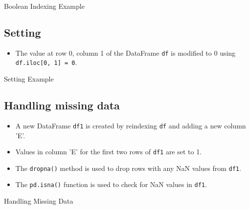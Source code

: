 		\begin{code}[h!]
		    
		
		\caption{Boolean Indexing Example}
		
		\end{code}

		\subsection{Setting}
		\begin{itemize}
			\item The value at row 0, column 1 of the DataFrame \texttt{df} is modified to 0 using \texttt{df.iloc[0, 1] = 0}.
		\end{itemize}
		
			\begin{code}[h!]
			    
			
			\caption{Setting Example}
			
			\end{code}


	\subsection{Handling missing data}
	\begin{itemize}
		
		\item A new DataFrame \texttt{df1} is created by reindexing \texttt{df} and adding a new column 'E'.
		
		\item Values in column 'E' for the first two rows of \texttt{df1} are set to 1.
		
		\item The \texttt{dropna()} method is used to drop rows with any NaN values from \texttt{df1}.
		
		\item The \texttt{pd.isna()} function is used to check for NaN values in \texttt{df1}.
		
	\end{itemize}


	\begin{code}[h!]
	    
	
	\caption{Handling Missing Data}
	
	\end{code}


